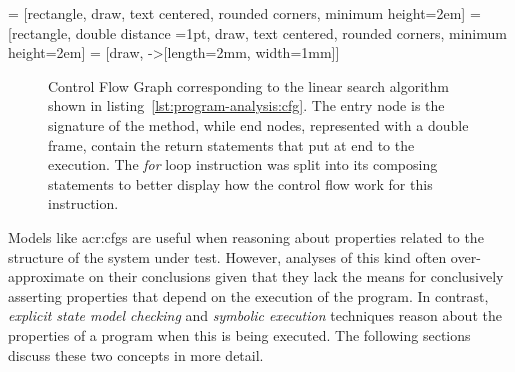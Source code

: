  = [rectangle, draw, text centered, rounded corners, minimum height=2em]
 = [rectangle, double distance =1pt, draw, text centered, rounded corners, minimum height=2em]
 = [draw, -{>[length=2mm, width=1mm]}]

\begin{figure}[t]
\centering
{}
\caption[Control Flow Graph of Linear Search Algorithm]{Control Flow Graph corresponding to the linear search algorithm shown in listing~\ref{lst:program-analysis:cfg}. The entry node is the signature of the method, while end nodes, represented with a double frame, contain the return statements that put at end to the execution. The \textit{for} loop instruction was split into its composing statements to better display how the control flow work for this instruction.}
\label{fig:program-analysis:cfg}
\end{figure}

Models like \acrshort{acr:cfg}s are useful when reasoning about properties related to the structure of the system under test. However, analyses of this kind often over-approximate on their conclusions given that they lack the means for conclusively asserting properties that depend on the execution of the program. In contrast, \textit{explicit state model checking} and \textit{symbolic execution} techniques reason about the properties of a program when this is being executed. The following sections discuss these two concepts in more detail.

